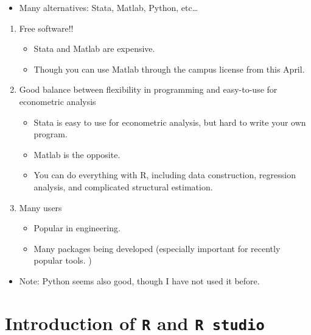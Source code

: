 \documentclass[]{book}
\providecommand{\tightlist}{%
  \setlength{\itemsep}{0pt}\setlength{\parskip}{0pt}}
\begin{document}
\begin{itemize}
\tightlist
\item
  Many alternatives: Stata, Matlab, Python, etc\ldots{}
\end{itemize}

\begin{enumerate}
\def\labelenumi{\arabic{enumi}.}
\tightlist
\item
  Free software!!

  \begin{itemize}
  \tightlist
  \item
    Stata and Matlab are expensive.
  \item
    Though you can use Matlab through the campus license from this April.
  \end{itemize}
\item
  Good balance between flexibility in programming and easy-to-use for econometric analysis

  \begin{itemize}
  \tightlist
  \item
    Stata is easy to use for econometric analysis, but hard to write your own program.
  \item
    Matlab is the opposite.
  \item
    You can do everything with R, including data construction, regression analysis, and complicated structural estimation.
  \end{itemize}
\item
  Many users

  \begin{itemize}
  \tightlist
  \item
    Popular in engineering.
  \item
    Many packages being developed (especially important for recently popular tools. )
  \end{itemize}
\end{enumerate}

\begin{itemize}
\tightlist
\item
  Note: Python seems also good, though I have not used it before.
\end{itemize}

\hypertarget{introduction-of-r-and-r-studio}{%
\chapter{\texorpdfstring{Introduction of \texttt{R} and \texttt{R\ studio}}{Introduction of R and R studio}}\label{introduction-of-r-and-r-studio}}
\end{document}
